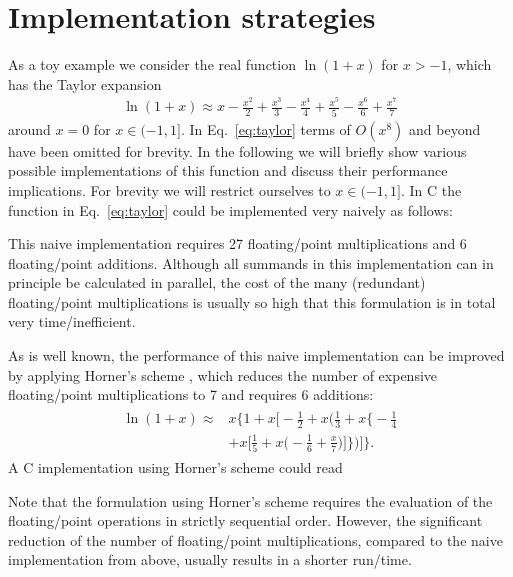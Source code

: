 \documentclass[10pt,DIV=16,twocolumn,numbers=noenddot]{scrartcl}
\begin{document}
\section{Implementation strategies}
\label{sec:toymodel}

As a toy example we consider the real function $\ln(1+x)$ for $x>-1$,
which has the Taylor expansion
%
\begin{align}
  \ln(1+x) \approx x - \frac{x^2}{2} + \frac{x^3}{3} - \frac{x^4}{4} + \frac{x^5}{5} - \frac{x^6}{6} + \frac{x^7}{7}
  \label{eq:taylor}
\end{align}
%
around $x=0$ for $x\in(-1,1]$.  In Eq.~\eqref{eq:taylor} terms of
$O(x^8)$ and beyond have been omitted for brevity.  In the following
we will briefly show various possible implementations of this function
and discuss their performance implications.  For brevity we will
restrict ourselves to $x\in(-1,1]$.  In C the function in
Eq.~\eqref{eq:taylor} could be implemented very naively as follows:
%

%
This naive implementation requires 27 floating\-/point multiplications
and 6 floating\-/point additions.  Although all summands in this
implementation can in principle be calculated in parallel, the cost of
the many (redundant) floating\-/point multiplications is usually so
high that this formulation is in total very time\-/inefficient.

As is well known, the performance of this naive implementation can be
improved by applying Horner's scheme \cite{horner}, which reduces the
number of expensive floating\-/point multiplications to 7 and requires
6 additions:
%
\begin{align}
\begin{split}
  \ln(1+x) \approx{}& x \bigg\{1 + x \bigg[-\frac{1}{2} + x \bigg(\frac{1}{3} + x \bigg\{-\frac{1}{4} \\
  &+ x \bigg[\frac{1}{5} + x\bigg(-\frac{1}{6} + \frac{x}{7}\bigg)\bigg]\bigg\}\bigg)\bigg]\bigg\}.
\end{split}\label{eq:horner}%
\end{align}
%
A C implementation using Horner's scheme could read
%

%
Note that the formulation using Horner's scheme requires the
evaluation of the floating\-/point operations in strictly sequential
order.  However, the significant reduction of the number of
floating\-/point multiplications, compared to the naive implementation
from above, usually results in a shorter run\-/time.
\end{document}
